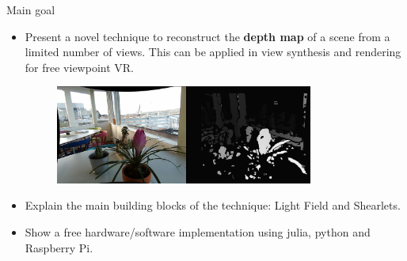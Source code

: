 \begin{frame}{Main goal}
\begin{block}{}
\begin{itemize}
\item Present a novel technique to reconstruct the \textbf{depth map} of a scene from a limited number of views. This can be applied in view synthesis and rendering for free viewpoint VR.
\begin{figure} 
\centering
\includegraphics[width=0.8\textwidth]{./images/depth-final.jpg}
\end{figure}

\pause 
\item Explain the main building blocks of the technique: Light Field and Shearlets.

\pause
\item Show a free hardware/software implementation using julia, python and Raspberry Pi.
\end{itemize}
\end{block}
\end{frame}

